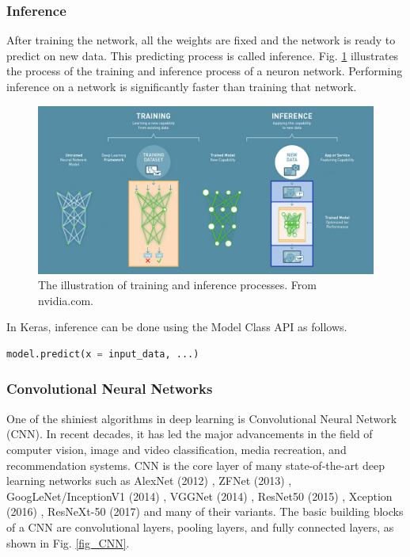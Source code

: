 \subsubsection{Inference}
After training the network, all the weights are fixed and the network is ready to predict on new data. This predicting process is called inference. Fig. \ref{fig_train_vs_infer} illustrates the process of the training and inference process of a neuron network. Performing inference on a network is significantly faster than training that network.
\begin{figure}[h!]
\begin{center}
\includegraphics[width = 13cm]{img/train_inference.jpg}
\caption[The illustration of training and inference processes]{The illustration of training and inference processes. From nvidia.com.\label{fig_train_vs_infer}}
\end{center}
\end{figure}

In Keras, inference can be done using the Model Class API as follows.
\begin{lstlisting}[language=python,frame=single]
model.predict(x = input_data, ...)
\end{lstlisting}

\subsubsection{Convolutional Neural Networks}
One of the shiniest algorithms in deep learning is Convolutional Neural Network (CNN). In recent decades, it has led the major advancements in the field of computer vision, image and video classification, media recreation, and recommendation systems. CNN is the core layer of many state-of-the-art deep learning networks such as AlexNet (2012) \cite{krizhevsky2012imagenet}, ZFNet (2013) \cite{zeiler2014visualizing}, GoogLeNet/InceptionV1 (2014) \cite{szegedy2015going}, VGGNet (2014) \cite{simonyan2014very}, ResNet50 (2015) \cite{he2016deep}, Xception (2016) \cite{chollet2017xception}, ResNeXt-50 (2017) \cite{xie2017aggregated} and many of their variants. The basic building blocks of a CNN are convolutional layers, pooling layers, and fully connected layers, as shown in Fig. \ref{fig_CNN}. 

